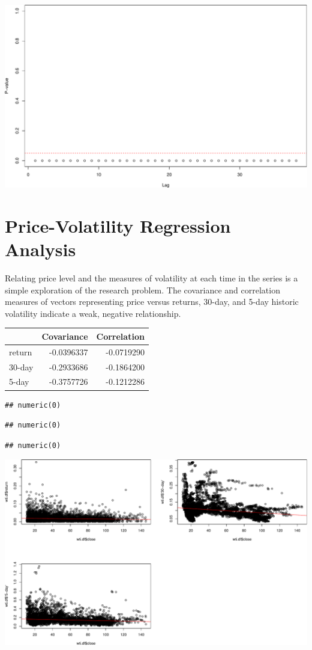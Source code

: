 \documentclass[11pt,]{article}
\makeatletter
\def\maxwidth{\ifdim\Gin@nat@width>\linewidth\linewidth
\else\Gin@nat@width\fi}
\let\Oldincludegraphics\includegraphics
\renewcommand{\includegraphics}[1]{\Oldincludegraphics[width=\maxwidth]{#1}}
\makeatother
\begin{document}
\includegraphics{Figs/unnamed-chunk-7-1.pdf}

\section{Price-Volatility Regression
Analysis}\label{price-volatility-regression-analysis}

Relating price level and the measures of volatility at each time in the
series is a simple exploration of the research problem. The covariance
and correlation measures of vectors representing price versus returns,
30-day, and 5-day historic volatility indicate a weak, negative
relationship.

\begin{longtable}[]{@{}lrr@{}}
\toprule
& Covariance & Correlation\tabularnewline
\midrule
\endhead
return & -0.0396337 & -0.0719290\tabularnewline
30-day & -0.2933686 & -0.1864200\tabularnewline
5-day & -0.3757726 & -0.1212286\tabularnewline
\bottomrule
\end{longtable}

\begin{verbatim}
## numeric(0)
\end{verbatim}

\begin{verbatim}
## numeric(0)
\end{verbatim}

\begin{verbatim}
## numeric(0)
\end{verbatim}

\includegraphics{Figs/unnamed-chunk-9-1.pdf}
\end{document}
